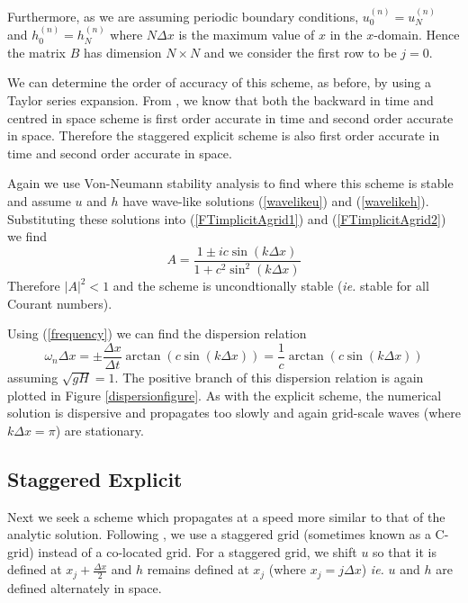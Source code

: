 \documentclass[a4paper, 10.5pt, notitlepage]{article}
\begin{document}
Furthermore, as we are assuming periodic boundary conditions, $u_{0}^{(n)} = u_{N}^{(n)}$ and $h_{0}^{(n)} = h_{N}^{(n)}$ where $N\Delta x$ is the maximum value of $x$ in the $x$-domain. Hence the matrix $B$ has dimension $N \times N$ and we consider the first row to be $j = 0$. 

We can determine the order of accuracy of this scheme, as before, by using a Taylor series expansion.  From \cite{MPE textbook}, we know that both the backward in time and centred in space scheme is first order accurate in time and second order accurate in space. Therefore the staggered explicit scheme is also first order accurate in time and second order accurate in space.

Again we use Von-Neumann stability analysis to find where this scheme is stable and assume $u$ and $h$ have wave-like solutions (\ref{wavelikeu}) and (\ref{wavelikeh}). Substituting these solutions into (\ref{FTimplicitAgrid1}) and (\ref{FTimplicitAgrid2}) we find
\begin{equation}
A = \frac{1 \pm i c\sin(k\Delta x)}{1 + c^{2}\sin^{2}(k\Delta x)}
\end{equation}
Therefore $\lvert A \rvert ^{2} < 1$ and the scheme is uncondtionally stable (\textit{ie.} stable for all Courant numbers). 

Using (\ref{frequency}) we can find the dispersion relation
\begin{equation}
\omega_{n} \Delta x = \pm\frac{\Delta x}{\Delta t} \arctan(c\sin(k\Delta x)) = \frac{1}{c}  \arctan(c\sin(k\Delta x))
\end{equation}
assuming $\sqrt{gH} = 1$. The positive branch of this dispersion relation is again plotted in Figure \ref{dispersionfigure}. As with the explicit scheme, the numerical solution is dispersive and propagates too slowly and again grid-scale waves (where $k\Delta x = \pi$) are stationary. 

\subsection{Staggered Explicit}
Next we seek a scheme which propagates at a speed more similar to that of the analytic solution. Following \cite{MPE textbook}, we use a staggered grid (sometimes known as a C-grid) instead of a co-located grid. For a staggered grid, we shift $u$ so that it is defined at $x_{j} + \frac{\Delta x}{2}$ and $h$ remains defined at $x_{j}$ (where $x_{j} = j \Delta x$) \textit{ie.} $u$ and $h$ are defined alternately in space.
\end{document}
